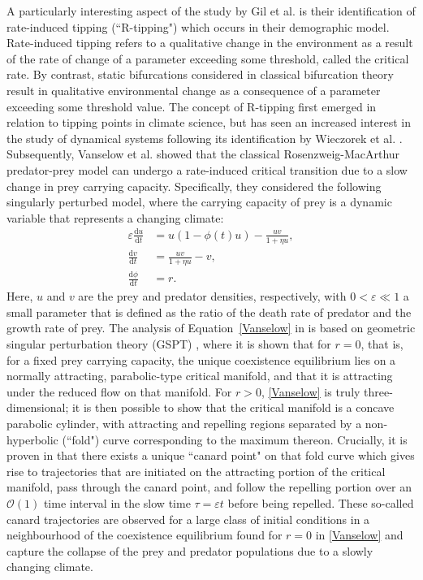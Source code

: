 \documentclass{article}
\theoremstyle{definition}
\numberwithin{equation}{section}
\newcommand{\dd}{\mathrm{d}}
\begin{document}
A particularly interesting aspect of the study by Gil et al. \cite{gil_2017_social} is their identification of rate-induced tipping (``R-tipping") which occurs in their demographic model. Rate-induced tipping refers to a qualitative change in the environment as a result of the rate of change of a parameter exceeding some threshold, called the critical rate. By contrast, static bifurcations considered in classical bifurcation theory result in qualitative environmental change as a consequence of a parameter exceeding some threshold value. The concept of R-tipping first emerged in relation to tipping points in climate science, but has seen an increased interest in the study of dynamical systems following its identification by Wieczorek et al. \cite{wieczorek_2010_excitability}. Subsequently, Vanselow et al. \cite{vanselow_2019_when} showed that the classical Rosenzweig-MacArthur predator-prey model can undergo a rate-induced critical transition due to a slow change in prey carrying capacity. Specifically, they considered the following singularly perturbed model, where the carrying capacity of prey is a dynamic variable that represents a changing climate:
\begin{equation}
\begin{aligned}
    \varepsilon\frac{\dd u}{\dd t}&=u(1-\phi(t) u)-\frac{uv}{1+\eta u},\\
    \frac{\dd v}{\dd t}&=\frac{uv}{1+\eta u}-v,\\
    \frac{\dd\phi}{\dd t}&=r.
    \label{Vanselow}
\end{aligned}
\end{equation}
Here, $u$ and $v$ are the prey and predator densities, respectively, with $0<\varepsilon\ll1$ a small parameter that is defined as the ratio of the death rate of predator and the growth rate of prey. The analysis of Equation~\eqref{Vanselow} in \cite{vanselow_2019_when} is based on geometric singular perturbation theory (GSPT) \cite{MTSD}, where it is shown that 
for $r=0$, that is, for a fixed prey carrying capacity, the unique coexistence equilibrium lies on a normally attracting, parabolic-type critical manifold, and that it is attracting under the reduced flow on that manifold. For $r>0$, \eqref{Vanselow} is truly three-dimensional; it is then possible to show that the critical manifold is a concave parabolic cylinder, with attracting and repelling regions separated by a non-hyperbolic (``fold") curve corresponding to the maximum thereon. Crucially, 
it is proven in \cite{vanselow_2019_when} that there exists a unique ``canard point" \cite{SZMOLYAN2001419} on that fold curve which gives rise to trajectories that are initiated on the attracting portion of the critical manifold, pass through the canard point, and follow the repelling portion over an $\mathcal{O}(1)$ time interval in the slow time $\tau=\varepsilon t$ before being repelled. These so-called canard trajectories are observed for a large class of initial conditions in a neighbourhood of the coexistence equilibrium found for $r=0$ in \eqref{Vanselow} and capture the collapse of the prey and predator populations due to a slowly changing climate. 
\end{document}
